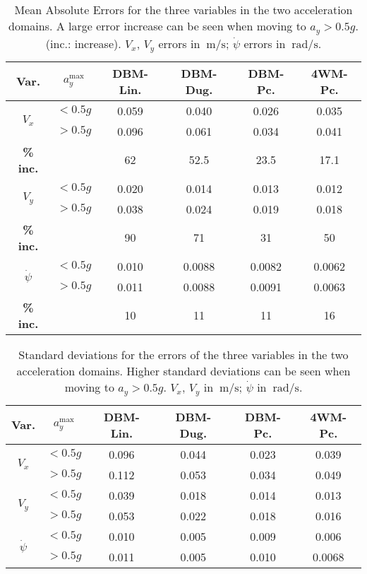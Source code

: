 \documentclass[journal]{IEEEtran}
\begin{document}
\begin{table}[h]
\centering
\caption{Mean Absolute Errors for the three variables in the two acceleration domains. A large error increase can be seen when moving to $a_y>0.5g$. (inc.: increase). $V_x$, $V_y$ errors in $\SI{}{\meter\per\second}$; $\dot\psi$ errors in $\SI{}{\radian\per\second}$.}
{\begin{tabular}{cccccc}
\toprule
\textbf{Var.} & $a_y^{\text{max}}$ & \textbf{DBM-Lin.} & \textbf{DBM-Dug.} & \textbf{DBM-Pc.} & \textbf{4WM-Pc.}\\
\midrule
\multirow{2}{*}{$V_x$} & $<0.5g$  & 0.059 & 0.040 & 0.026 & 0.035 \\ 
\cmidrule{2-6}
& $>0.5g$ & 0.096 & 0.061 & 0.034 & 0.041 \\
\cmidrule{2-6}
\textbf{\% inc.} & & 62 & 52.5 & 23.5 & 17.1\\
\midrule
\multirow{2}{*}{$V_y$} &  $<0.5g$ & 0.020 & 0.014 & 0.013  & 0.012\\
\cmidrule{2-6}
& $>0.5g$ & 0.038 & 0.024 & 0.019 & 0.018 \\
\cmidrule{2-6}
\textbf{\% inc.} & & 90 & 71 & 31 & 50 \\
\midrule
\multirow{2}{*}{$\dot{\psi}$} & $<0.5g$ & 0.010 & 0.0088 & 0.0082 & 0.0062 \\
\cmidrule{2-6}
& $>0.5g$ & 0.011 & 0.0088 & 0.0091 & 0.0063 \\
\cmidrule{2-6}
\textbf{\% inc.} & & 10 & 11 & 11 & 16\\
\bottomrule
\end{tabular}}

\label{modelComp.tab}
\end{table}

\begin{table}[h]
\centering
\caption{Standard deviations for the errors of the three variables in the two acceleration domains. Higher standard deviations can be seen when moving to $a_y>0.5g$. $V_x$, $V_y$ in $\SI{}{\meter\per\second}$; $\dot\psi$ in $\SI{}{\radian\per\second}$.}
{\begin{tabular}{cccccc}
\toprule
\textbf{Var.} & $a_y^{\text{max}}$ & \textbf{DBM-Lin.} & \textbf{DBM-Dug.} & \textbf{DBM-Pc.} & \textbf{4WM-Pc.}\\
\midrule
\multirow{2}{*}{$V_x$} & $<0.5g$  & 0.096 & 0.044 & 0.023 & 0.039 \\ 
\cmidrule{2-6}
& $>0.5g$ & 0.112 & 0.053 & 0.034 & 0.049 \\
\midrule
\multirow{2}{*}{$V_y$} &  $<0.5g$ & 0.039 & 0.018 & 0.014  & 0.013\\
\cmidrule{2-6}
& $>0.5g$ & 0.053 & 0.022 & 0.018 & 0.016 \\
\midrule
\multirow{2}{*}{$\dot{\psi}$} & $<0.5g$ & 0.010 & 0.005 & 0.009 & 0.006 \\
\cmidrule{2-6}
& $>0.5g$ & 0.011 & 0.005 & 0.010 & 0.0068 \\
\bottomrule
\end{tabular}}

\label{modelCompStd.tab}
\end{table}
\end{document}

